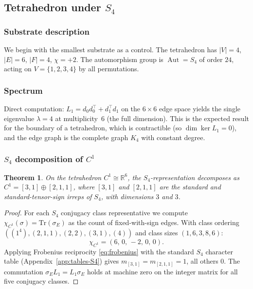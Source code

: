 \documentclass[12pt,a4paper]{article}
\newtheorem{theorem}{Theorem}[section]
\theoremstyle{definition}
\theoremstyle{remark}
\newcommand{\bR}{\mathbb{R}}
\DeclareMathOperator{\Aut}{Aut}
\begin{document}
\subsection{Tetrahedron under $S_4$}\label{sec:tet}

\subsubsection{Substrate description}\label{sec:tet-description}

We begin with the smallest substrate as a control. The tetrahedron has
$|V| = 4$, $|E| = 6$, $|F| = 4$, $\chi = +2$. The automorphism group is
$\Aut = S_4$ of order $24$, acting on $V = \{1, 2, 3, 4\}$ by all
permutations.

\subsubsection{Spectrum}\label{sec:tet-spectrum}

Direct computation: $L_1 = d_0 d_0^\top + d_1^\top d_1$ on the
$6 \times 6$ edge space yields the single eigenvalue $\lambda = 4$ at
multiplicity~$6$ (the full dimension). This is the expected result for
the boundary of a tetrahedron, which is contractible (so $\dim \ker L_1 =
0$), and the edge graph is the complete graph $K_4$ with constant degree.

\subsubsection{$S_4$ decomposition of $C^1$}\label{sec:tet-decomp}

\begin{theorem}\label{thm:tet-decomp}
On the tetrahedron $C^1 \cong \bR^6$, the $S_4$-representation decomposes
as $C^1 = [3,1] \oplus [2,1,1]$, where $[3,1]$ and $[2,1,1]$ are the
standard and standard-tensor-sign irreps of $S_4$, with dimensions $3$
and $3$.
\end{theorem}

\begin{proof}
For each $S_4$ conjugacy class representative we compute $\chi_{C^1}(\sigma)
= \mathrm{Tr}(\sigma_E)$ as the count of fixed-with-sign edges. With class
ordering $((1^4), (2,1,1), (2,2), (3,1), (4))$ and class sizes
$(1, 6, 3, 8, 6)$:
\[
  \chi_{C^1} = (6,\, 0,\, -2,\, 0,\, 0).
\]
Applying Frobenius reciprocity \eqref{eq:frobenius} with the standard
$S_4$ character table (Appendix~\ref{app:tables-S4}) gives
$m_{[3,1]} = m_{[2,1,1]} = 1$, all others $0$. The commutation
$\sigma_E L_1 = L_1 \sigma_E$ holds at machine zero on the integer
matrix for all five conjugacy classes.
\end{proof}
\end{document}
